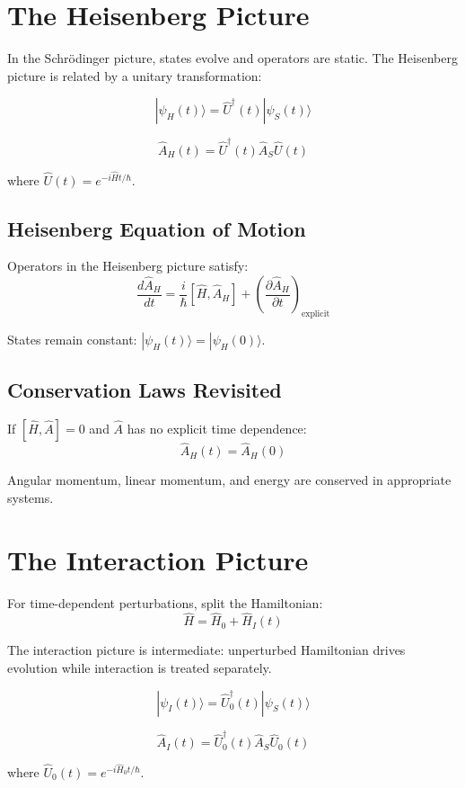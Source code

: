\documentclass[12pt,openany,oneside]{book}
\newcommand{\ket}[1]{|#1\rangle}
\begin{document}
{{{\section{The Heisenberg Picture}

In the Schrödinger picture, states evolve and operators are static. The Heisenberg picture is related by a unitary transformation:

\[
\ket{\psi_H(t)} = \hat{U}^\dagger(t)\ket{\psi_S(t)}
\]

\[
\hat{A}_H(t) = \hat{U}^\dagger(t)\hat{A}_S\hat{U}(t)
\]

where $\hat{U}(t) = e^{-i\hat{H}t/\hbar}$.

\subsection{Heisenberg Equation of Motion}

Operators in the Heisenberg picture satisfy:
\[
\frac{d\hat{A}_H}{dt} = \frac{i}{\hbar}[\hat{H}, \hat{A}_H] + \left(\frac{\partial\hat{A}_H}{\partial t}\right)_{\text{explicit}}
\]

States remain constant: $\ket{\psi_H(t)} = \ket{\psi_H(0)}$.

\subsection{Conservation Laws Revisited}

If $[\hat{H}, \hat{A}] = 0$ and $\hat{A}$ has no explicit time dependence:
\[
\hat{A}_H(t) = \hat{A}_H(0)
\]

Angular momentum, linear momentum, and energy are conserved in appropriate systems.

\section{The Interaction Picture}

For time-dependent perturbations, split the Hamiltonian:
\[
\hat{H} = \hat{H}_0 + \hat{H}_I(t)
\]

The interaction picture is intermediate: unperturbed Hamiltonian drives evolution while interaction is treated separately.

\[
\ket{\psi_I(t)} = \hat{U}_0^\dagger(t)\ket{\psi_S(t)}
\]

\[
\hat{A}_I(t) = \hat{U}_0^\dagger(t)\hat{A}_S\hat{U}_0(t)
\]

where $\hat{U}_0(t) = e^{-i\hat{H}_0t/\hbar}$.

}}}
\end{document}
